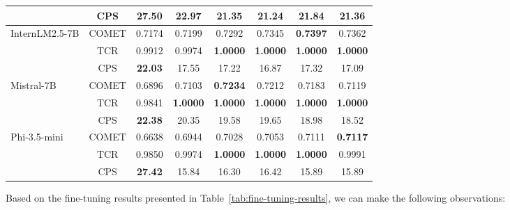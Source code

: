 \documentclass[conference]{IEEEtran}
\begin{document}
\begin{table*}[htbp]
{\begin{tabular}{|l|c|c|c|c|c|c|c|}
 & CPS & \textbf{27.50} & 22.97 & 21.35 & 21.24 & 21.84 & 21.36 \\
\hline
\multirow{3}{*}{InternLM2.5-7B} & COMET & 0.7174 & 0.7199 & 0.7292 & 0.7345 & \textbf{0.7397} & 0.7362 \\
 & TCR & 0.9912 & 0.9974 & \textbf{1.0000} & \textbf{1.0000} & \textbf{1.0000} & \textbf{1.0000} \\
 & CPS & \textbf{22.03} & 17.55 & 17.22 & 16.87 & 17.32 & 17.09 \\
\hline
\multirow{3}{*}{Mistral-7B} & COMET & 0.6896 & 0.7103 & \textbf{0.7234} & 0.7212 & 0.7183 & 0.7119 \\
 & TCR & 0.9841 & \textbf{1.0000} & \textbf{1.0000} & \textbf{1.0000} & \textbf{1.0000} & \textbf{1.0000} \\
 & CPS & \textbf{22.38} & 20.35 & 19.58 & 19.65 & 18.98 & 18.52 \\
\hline
\multirow{3}{*}{Phi-3.5-mini} & COMET & 0.6638 & 0.6944 & 0.7028 & 0.7053 & 0.7111 & \textbf{0.7117} \\
 & TCR & 0.9850 & 0.9974 & \textbf{1.0000} & \textbf{1.0000} & \textbf{1.0000} & 0.9991 \\
 & CPS & \textbf{27.42} & 15.84 & 16.30 & 16.42 & 15.89 & 15.89 \\
\hline
\end{tabular}%
}
\end{table*}

Based on the fine-tuning results presented in Table~\ref{tab:fine-tuning-results}, we can make the following observations:
\end{document}
